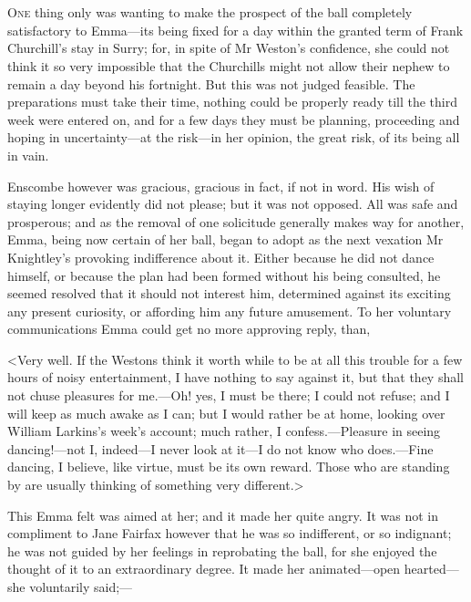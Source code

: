 \chapter[Chapter \thechapter]{}
\lettrine[lraise=0.3]{O}{ne} thing only was wanting to make the prospect of the ball completely satisfactory to Emma—its being fixed for a day within the granted term of Frank Churchill's stay in Surry; for, in spite of Mr Weston's confidence, she could not think it so very impossible that the Churchills might not allow their nephew to remain a day beyond his fortnight. But this was not judged feasible. The preparations must take their time, nothing could be properly ready till the third week were entered on, and for a few days they must be planning, proceeding and hoping in uncertainty—at the risk—in her opinion, the great risk, of its being all in vain.

Enscombe however was gracious, gracious in fact, if not in word. His wish of staying longer evidently did not please; but it was not opposed. All was safe and prosperous; and as the removal of one solicitude generally makes way for another, Emma, being now certain of her ball, began to adopt as the next vexation Mr Knightley's provoking indifference about it. Either because he did not dance himself, or because the plan had been formed without his being consulted, he seemed resolved that it should not interest him, determined against its exciting any present curiosity, or affording him any future amusement. To her voluntary communications Emma could get no more approving reply, than,

<Very well. If the Westons think it worth while to be at all this trouble for a few hours of noisy entertainment, I have nothing to say against it, but that they shall not chuse pleasures for me.—Oh! yes, I must be there; I could not refuse; and I will keep as much awake as I can; but I would rather be at home, looking over William Larkins's week's account; much rather, I confess.—Pleasure in seeing dancing!—not I, indeed—I never look at it—I do not know who does.—Fine dancing, I believe, like virtue, must be its own reward. Those who are standing by are usually thinking of something very different.>

This Emma felt was aimed at her; and it made her quite angry. It was not in compliment to Jane Fairfax however that he was so indifferent, or so indignant; he was not guided by her feelings in reprobating the ball, for she enjoyed the thought of it to an extraordinary degree. It made her animated—open hearted—she voluntarily said;—

